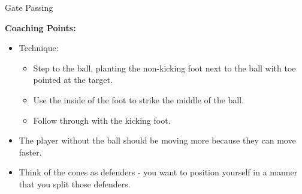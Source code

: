 \begin{oddBlock}{Gate Passing}
\begin{minipage}[t]{\linewidth}
\begin{minipage}{.6\linewidth}
        \textbf{Coaching Points:}
        \begin{itemize}
        \setlength{\itemsep}{0pt}
        \setlength{\parskip}{0pt}
        \setlength{\parsep}{0pt}
        \item Technique:
        \begin{itemize}
            \setlength{\itemsep}{0pt}
            \setlength{\parskip}{0pt}
            \setlength{\parsep}{0pt}
            \item Step to the ball, planting the non-kicking foot next to the ball with toe pointed at the target.
            \item Use the inside of the foot to strike the middle of the ball.
            \item Follow through with the kicking foot.
        \end{itemize}
        \item The player without the ball should be moving more because they can move faster.
        \item Think of the cones as defenders - you want to position yourself in a manner that you split those defenders.
        \end{itemize}

    \end{minipage}
\end{minipage}

\end{oddBlock}